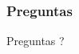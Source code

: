 \documentclass{beamer}
\begin{document}


\begin{frame}
  \frametitle{Preguntas}
  \hspace{4cm}\huge{Preguntas ?}  
\end{frame}
\end{document}
